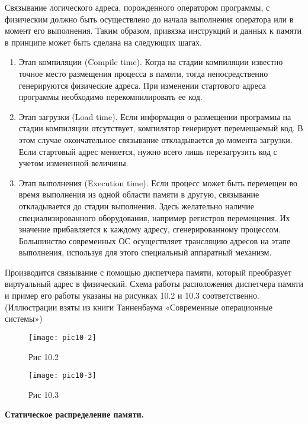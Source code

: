 Связывание логического адреса, порожденного оператором программы, с физическим должно быть осуществлено до начала выполнения оператора или в момент его выполнения. Таким образом, привязка инструкций и данных к памяти в принципе может быть сделана на следующих шагах.

\begin{enumerate}
  \item Этап компиляции (Compile time). Когда на стадии компиляции известно точное место размещения процесса в памяти, тогда непосредственно генерируются физические адреса. При изменении стартового адреса программы необходимо перекомпилировать ее код.
  \item Этап загрузки (Load time). Если информация о размещении программы на стадии компиляции отсутствует, компилятор генерирует перемещаемый код. В этом случае окончательное связывание откладывается до момента загрузки. Если стартовый адрес меняется, нужно всего лишь перезагрузить код с учетом измененной величины.
  \item Этап выполнения (Execution time). Если процесс может быть перемещен во время выполнения из одной области памяти в другую, связывание откладывается до стадии выполнения. Здесь желательно наличие специализированного оборудования, например регистров перемещения. Их значение прибавляется к каждому адресу, сгенерированному процессом. Большинство современных ОС осуществляет трансляцию адресов на этапе выполнения, используя для этого специальный аппаратный механизм.
\end{enumerate}

Производится связывание с помощью диспетчера памяти, который преобразует виртуальный адрес в физический. Схема работы расположения диспетчера памяти и пример его работы указаны на рисунках 10.2 и 10.3 соответственно. (Иллюстрации взяты из книги Танненбаума «Современные операционные системы»)
\newpage
\begin{figure}[h]
  \begin{center}
  \texttt{[image: pic10-2]}
  \caption{Рис 10.2}
  \end{center}
\end{figure}

\begin{figure}[h]
  \begin{center}
  \texttt{[image: pic10-3]}
  \caption{Рис 10.3}
  \end{center}
\end{figure}

\begin{center}{\bfseries Статическое распределение памяти.}
\end{center}

